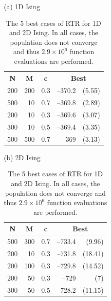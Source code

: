 \begin{table}[tb]
\centering
\caption{The 5 best cases of RTR for 1D and 2D Ising. In all cases, the
 population does not converge and thus $2.9\times 10^6$ function
 evaluations are performed.}

(a) 1D Ising\\
\begin{tabular}{|r|r|r|rr|}
\hline
\multicolumn{1}{|c|}{N} & \multicolumn{1}{|c|}{M} & 
\multicolumn{1}{c|}{c} & \multicolumn{2}{c|}{Best} \\ \hline
200 & 200 & 0.3 & --370.2 & (5.55) \\ \hline
500 & 10 & 0.7 & --369.8 & (2.89) \\ \hline
200 & 10 & 0.3 & --369.6 & (3.07) \\ \hline
300 & 10 & 0.5 & --369.4 & (3.35) \\ \hline
500 & 500 & 0.7 & --369 & (3.13) \\ \hline
\end{tabular}


\vspace{0.5cm}

(b) 2D Ising\\
\begin{tabular}{|r|r|r|rr|}
\hline
\multicolumn{1}{|c|}{N} & \multicolumn{1}{|c|}{M} & 
\multicolumn{1}{c|}{c} & \multicolumn{2}{c|}{Best} \\ \hline
500 & 300 & 0.7 & --733.4 & (9.96) \\ \hline
200 & 10 & 0.3 & --731.8 & (18.41) \\ \hline
200 & 100 & 0.3 & --729.8 & (14.52) \\ \hline
200 & 50 & 0.3 & --729 & (7) \\ \hline
300 & 50 & 0.5 & --728.2 & (11.15) \\ \hline
\end{tabular}
\label{table_rtr_1d_2d}
\end{table}

